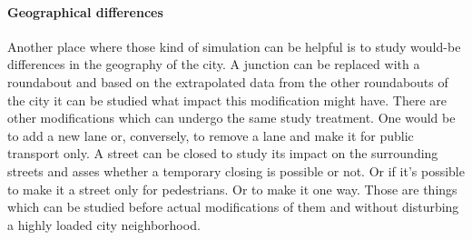 \documentclass[a4paper,12pt,twoside]{book}
\begin{document}
\paragraph{Geographical differences}

Another place where those kind of simulation can be helpful is to study would-be differences in the geography of the city. A junction can be replaced with a roundabout and based on the extrapolated data from the other roundabouts of the city it can be studied what impact this modification might have. There are other modifications which can undergo the same study treatment. One would be to add a new lane or, conversely, to remove a lane and make it for public transport only. A street can be closed to study its impact on the surrounding streets and asses whether a temporary closing is possible or not. Or if it's possible to make it a street only for pedestrians. Or to make it one way. Those are things which can be studied before actual modifications of them and without disturbing a highly loaded city neighborhood.


\end{document}

